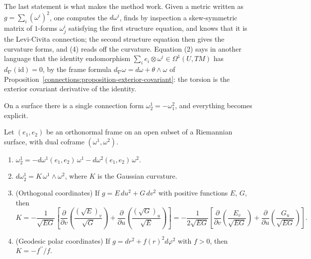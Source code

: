 The last statement is what makes the method work. Given a metric written as $g = \sum_i(\omega^i)^2$, one computes the $d\omega^i$, finds by inspection a skew-symmetric matrix of
$1$-forms $\omega^i_j$ satisfying the first structure equation, and knows that it is the Levi-Civita connection; the second structure equation then gives the curvature forms, and (4)
reads off the curvature. Equation (2) says in another language that the identity endomorphism $\sum_ie_i \otimes \omega^i \in \Omega^1(U, TM)$ has $d_\nabla(\mathrm{id}) = 0$, by the
frame formula $d_\nabla\omega = d\omega + \theta \wedge \omega$ of Proposition~\ref{connections:proposition-exterior-covariant}: the torsion is the exterior covariant derivative of the identity.

On a surface there is a single connection form $\omega^1_2 = -\omega^2_1$, and everything becomes explicit.

\begin{proposition}\label{riemannian-geometry:proposition-frames-surfaces}
Let $(e_1, e_2)$ be an orthonormal frame on an open subset of a Riemannian surface, with dual coframe $(\omega^1, \omega^2)$.
\begin{enumerate}
\item $\omega^1_2 = -d\omega^1(e_1, e_2)\,\omega^1 - d\omega^2(e_1, e_2)\,\omega^2$.
\item $d\omega^1_2 = K\,\omega^1 \wedge \omega^2$, where $K$ is the Gaussian curvature.
\item (Orthogonal coordinates) If $g = E\,du^2 + G\,dv^2$ with positive functions $E$, $G$, then
\[
K = -\frac{1}{\sqrt{EG}}\left[\frac{\partial}{\partial v}\left(\frac{(\sqrt E)_v}{\sqrt G}\right) + \frac{\partial}{\partial u}\left(\frac{(\sqrt G)_u}{\sqrt E}\right)\right]
= -\frac{1}{2\sqrt{EG}}\left[\frac{\partial}{\partial v}\left(\frac{E_v}{\sqrt{EG}}\right) + \frac{\partial}{\partial u}\left(\frac{G_u}{\sqrt{EG}}\right)\right].
\]
\item (Geodesic polar coordinates) If $g = dr^2 + f(r)^2d\varphi^2$ with $f > 0$, then $K = -f^{\prime\prime}/f$.
\end{enumerate}
\end{proposition}

